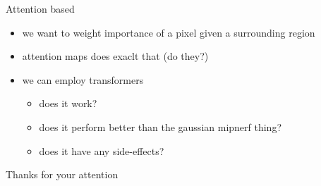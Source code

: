 \documentclass[aspectratio=1610,handout]{beamer}
\begin{document}
\begin{frame}{Attention based}
    \begin{itemize}
        \item we want to weight importance of a pixel given a surrounding region
        \item attention maps does exaclt that (do they?)
        \item we can employ transformers
        \begin{itemize}
            \item does it work?
            \item does it perform better than the gaussian mipnerf thing?
            \item does it have any side-effects?
        \end{itemize}
    \end{itemize}
\end{frame}

\begin{frame}
    \begin{center}
        Thanks for your attention
    \end{center}
\end{frame}
\end{document}

